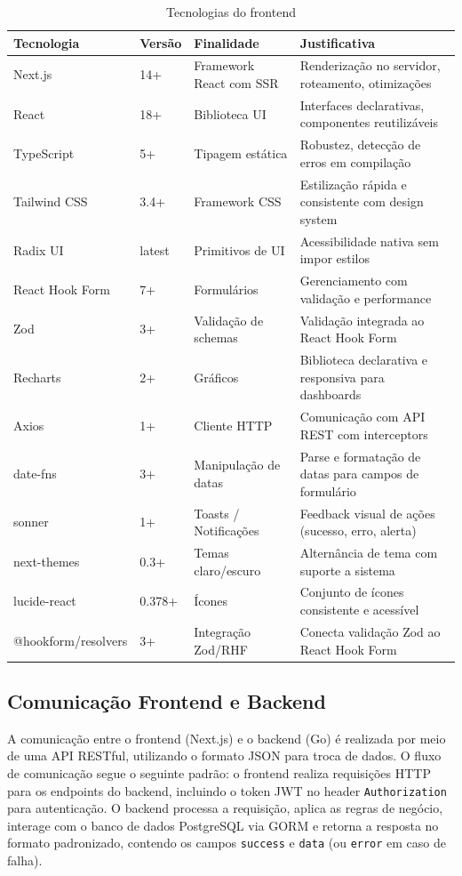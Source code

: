\documentclass[a4paper,12pt,oneside]{article}
\begin{document}
\begin{table}[H]
\centering
\caption{Tecnologias do frontend}
\label{tab:tech-frontend}
\small
\begin{tabularx}{\textwidth}{l l X X}
\toprule
\textbf{Tecnologia} & \textbf{Versão} & \textbf{Finalidade} & \textbf{Justificativa} \\
\midrule
Next.js & 14+ & Framework React com SSR & Renderização no servidor, roteamento, otimizações \\
React & 18+ & Biblioteca UI & Interfaces declarativas, componentes reutilizáveis \\
TypeScript & 5+ & Tipagem estática & Robustez, detecção de erros em compilação \\
Tailwind CSS & 3.4+ & Framework CSS & Estilização rápida e consistente com design system \\
Radix UI & latest & Primitivos de UI & Acessibilidade nativa sem impor estilos \\
React Hook Form & 7+ & Formulários & Gerenciamento com validação e performance \\
Zod & 3+ & Validação de schemas & Validação integrada ao React Hook Form \\
Recharts & 2+ & Gráficos & Biblioteca declarativa e responsiva para dashboards \\
Axios & 1+ & Cliente HTTP & Comunicação com API REST com interceptors \\
date-fns & 3+ & Manipulação de datas & Parse e formatação de datas para campos de formulário \\
sonner & 1+ & Toasts / Notificações & Feedback visual de ações (sucesso, erro, alerta) \\
next-themes & 0.3+ & Temas claro/escuro & Alternância de tema com suporte a sistema \\
lucide-react & 0.378+ & Ícones & Conjunto de ícones consistente e acessível \\
@hookform/resolvers & 3+ & Integração Zod/RHF & Conecta validação Zod ao React Hook Form \\
\bottomrule
\end{tabularx}
\end{table}

\subsection{Comunicação Frontend e Backend}

A comunicação entre o frontend (Next.js) e o backend (Go) é realizada por meio de uma API RESTful, utilizando o formato JSON para troca de dados. O fluxo de comunicação segue o seguinte padrão: o frontend realiza requisições HTTP para os endpoints do backend, incluindo o token JWT no header \texttt{Authorization} para autenticação. O backend processa a requisição, aplica as regras de negócio, interage com o banco de dados PostgreSQL via GORM e retorna a resposta no formato padronizado, contendo os campos \texttt{success} e \texttt{data} (ou \texttt{error} em caso de falha).
\end{document}
